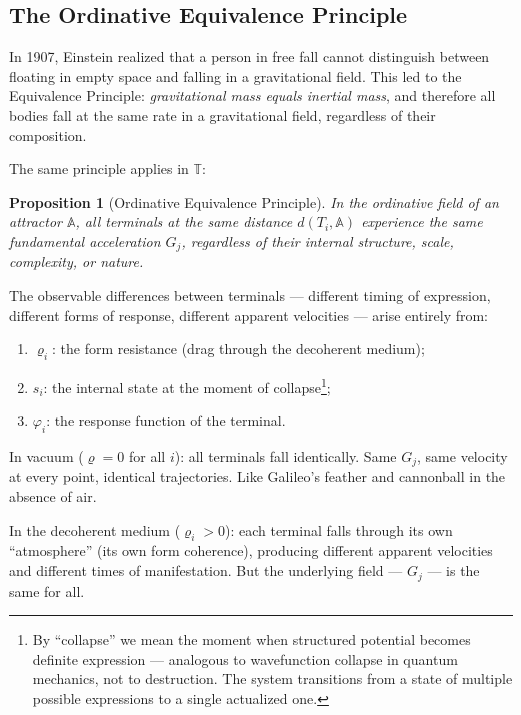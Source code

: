 \documentclass[12pt,a4paper]{article}
\newtheorem{proposition}{Proposition}[section]
\newcommand{\attr}{\mathbb{A}}
\newcommand{\tspc}{\mathbb{T}}
\newcommand{\Gj}{G_j}
\newcommand{\rhof}{\varrho}
\begin{document}
\subsection{The Ordinative Equivalence Principle}\label{subsec:equivalence}

In 1907, Einstein realized that a person in free fall cannot distinguish between floating in empty space and falling in a gravitational field. This led to the Equivalence Principle: \emph{gravitational mass equals inertial mass}, and therefore all bodies fall at the same rate in a gravitational field, regardless of their composition.

The same principle applies in $\tspc$:

\begin{proposition}[Ordinative Equivalence Principle]\label{prop:equivalence}
In the ordinative field of an attractor $\attr$, all terminals at the same distance $d(T_i, \attr)$ experience the same fundamental acceleration $\Gj$, regardless of their internal structure, scale, complexity, or nature.
\end{proposition}

\noindent The observable differences between terminals --- different timing of expression, different forms of response, different apparent velocities --- arise entirely from:

\begin{enumerate}[label=(\roman*)]
    \item $\rhof_i$: the form resistance (drag through the decoherent medium);
    \item $s_i$: the internal state at the moment of collapse\footnote{By ``collapse'' we mean the moment when structured potential becomes definite expression --- analogous to wavefunction collapse in quantum mechanics, not to destruction. The system transitions from a state of multiple possible expressions to a single actualized one.};
    \item $\varphi_i$: the response function of the terminal.
\end{enumerate}

In vacuum ($\rhof = 0$ for all $i$): all terminals fall identically. Same $\Gj$, same velocity at every point, identical trajectories. Like Galileo's feather and cannonball in the absence of air.

In the decoherent medium ($\rhof_i > 0$): each terminal falls through its own ``atmosphere'' (its own form coherence), producing different apparent velocities and different times of manifestation. But the underlying field --- $\Gj$ --- is the same for all.
\end{document}
